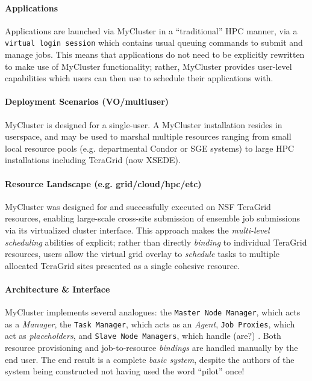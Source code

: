 \documentclass{sig-alternate}
\begin{document}
\paragraph{Applications}
Applications are launched via MyCluster in a ``traditional''
HPC manner, via a \texttt{virtual
login session} which contains usual queuing commands to submit
and manage jobs.  This means that applications do not need
to be explicitly rewritten to make use of MyCluster functionality;
rather, MyCluster provides user-level \pilotjob capabilities
which users can then use to schedule their applications with.

\paragraph{Deployment Scenarios (VO/multiuser)}
MyCluster is designed for a single-user.  A MyCluster
installation resides in userspace, and may be used
to marshal multiple resources ranging from small local resource pools
(e.g. departmental Condor or SGE systems) to large HPC installations
including TeraGrid (now XSEDE).

\paragraph{Resource Landscape (e.g. grid/cloud/hpc/etc)}
MyCluster was designed for and successfully executed on NSF TeraGrid
resources, enabling large-scale cross-site submission of ensemble
job submissions via its virtualized cluster interface.
This approach makes the \textit{multi-level scheduling} abilities
of \pilotjobs explicit; rather than directly \textit{binding}
to individual TeraGrid resources, users allow the virtual grid
overlay to \textit{schedule} tasks to multiple allocated TeraGrid sites
presented as a single cohesive resource. 

\paragraph{Architecture \& Interface}
MyCluster implements several \pilotjob analogues: the \texttt{Master
  Node Manager}, which acts as a \textit{\pilotjob Manager}, the
\texttt{Task Manager}, which acts as an \textit{\pilotjob Agent},
\texttt{Job Proxies}, which act as \textit{placeholders}, and
\texttt{Slave Node Managers}, which handle (are?) \textit{\pilotjob
  \cus}.  Both resource provisioning and job-to-resource \textit{bindings}
are handled manually by the end user.
The end result is a complete \textit{basic \pilotjob system}, despite the
authors of the system being constructed not having used the word ``pilot''
once!~\cite{1652061}
\end{document}
